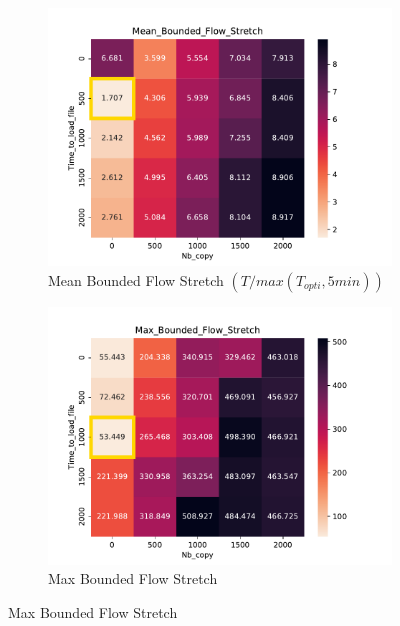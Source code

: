 \documentclass[a4paper]{article}
\begin{document}
\begin{figure}[H]
\begin{subfigure}[b]{0.4\linewidth}\centering\includegraphics[width=1\linewidth]{MBSS/plot/Heatmap_Stretch_with_a_minimum_FCFS_Score_Time_to_load_file_Nb_copy_2022-01-24->2022-01-24_450_128_32_256_4_1024.pdf}\caption{Mean Bounded Flow Stretch $(T/max(T_{opti}, 5min))$}\end{subfigure}
\begin{subfigure}[b]{0.4\linewidth}\centering\includegraphics[width=1\linewidth]{MBSS/plot/Heatmap_Max_Stretch_with_a_minimum_FCFS_Score_Time_to_load_file_Nb_copy_2022-01-24->2022-01-24_450_128_32_256_4_1024.pdf}\caption{Max Bounded Flow Stretch}\end{subfigure}

\end{figure}
\end{document}
